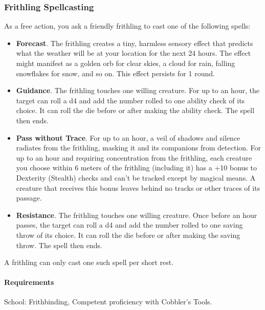\subsubsection{Frithling Spellcasting} \label{feat::frithlingspellcasting}
    As a free action, you ask a friendly frithling to cast one of the following spells:
    \begin{itemize}
        \item \textbf{Forecast}.
        The frithling creates a tiny, harmless sensory effect that predicts what the weather will be at your location for the next 24 hours.
        The effect might manifest as a golden orb for clear skies, a cloud for rain, falling snowflakes for snow, and so on.
        This effect persists for 1 round.
        \item \textbf{Guidance}.
        The frithling touches one willing creature.
        For up to an hour, the target can roll a d4 and add the number rolled to one ability check of its choice.
        It can roll the die before or after making the ability check.
        The spell then ends.
        \item \textbf{Pass without Trace}.
        For up to an hour, a veil of shadows and silence radiates from the frithling, masking it and its companions from detection.
        For up to an hour and requiring concentration from the frithling, each creature you choose within 6 meters of the frithling (including it) has a +10 bonus to Dexterity (Stealth) checks and can't be tracked except by magical means.
        A creature that receives this bonus leaves behind no tracks or other traces of its passage.
        \item \textbf{Resistance}.
        The frithling touches one willing creature.
        Once before an hour passes, the target can roll a d4 and add the number rolled to one saving throw of its choice.
        It can roll the die before or after making the saving throw.
        The spell then ends.
    \end{itemize}

    A frithling can only cast one such spell per short rest.
    \paragraph{Requirements} School: Frithbinding, Competent proficiency with Cobbler's Tools.
